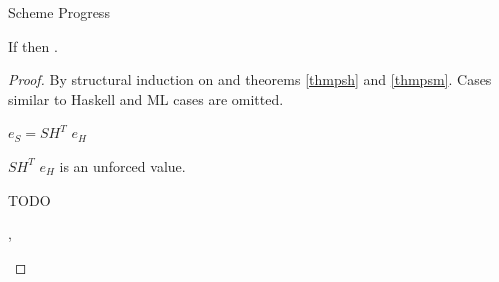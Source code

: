 \begin{theorem}{Scheme Progress}

\label{thmpss}

If \judes{}{\first{\varexps}}{\tytst} then \pshyp{\first{\varexps}}{\second{\varexps}}.

\begin{proof}

By structural induction on \first{\varexps} and theorems \ref{thmpsh} and \ref{thmpsm}.  Cases similar to Haskell and ML cases are omitted.


\begin{case}

$e_{S}=SH^{T}$ $e_{H}$

$SH^{T}$ $e_{H}$ is an unforced value.

TODO

\end{case}


\newcommand{\pssm}{\expsm{\first{\varcsm}}{\first{\varexpm}}}

\begin{case}{\pssm}

\pshypby
{\first{\varexpm}}
{\second{\varexpm}}
\pssub
{\first{\varexpm}}
{\second{\varexpm}}
{\pssm}
{\expsm{\first{\varcsm}}{\second{\varexpm}}}
\pserr
{\first{\varexpm}}
{\pssm}
\pscasesone
{\first{\varexpm}}
{\first{\varcsm}}
{\pssm}


\renewcommand{\x}{\expmh{\cslump}{\first{\varcsh}}{\first{\varexph}}}
\renewcommand{\y}{\expms{\cslump}{\first{\varvalfs}}}

\begin{subcase}{\cslump}

\psvalcanin
{\first{\varexpm}}
{\x, \y}
\psred
{\expsm{\cslump}{(\x)}}
{\expwrongd{\errvalue}}
\psred
{\expsm{\cslump}{(\y)}}
{\first{\varvalfs}}

\end{subcase}


\renewcommand{\x}{\first{\expnum{\varnum}}}

\begin{subcase}{\csnum}

\psvalcaneq
{\first{\varexpm}}
{\x}
\psred
{\expsm{\csnum}{\x}}
{\x}

\end{subcase}



\end{case}
\end{proof}
\end{theorem}
